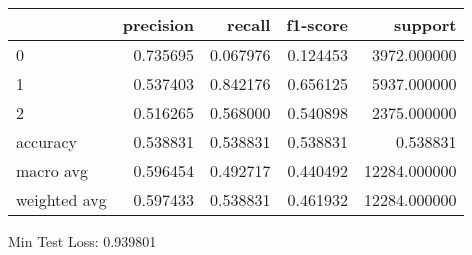 \begin{tabular}{lrrrr}
\toprule
{} &  precision &    recall &  f1-score &       support \\
\midrule
0            &   0.735695 &  0.067976 &  0.124453 &   3972.000000 \\
1            &   0.537403 &  0.842176 &  0.656125 &   5937.000000 \\
2            &   0.516265 &  0.568000 &  0.540898 &   2375.000000 \\
accuracy     &   0.538831 &  0.538831 &  0.538831 &      0.538831 \\
macro avg    &   0.596454 &  0.492717 &  0.440492 &  12284.000000 \\
weighted avg &   0.597433 &  0.538831 &  0.461932 &  12284.000000 \\
\bottomrule
\end{tabular}

Min Test Loss: 0.939801
